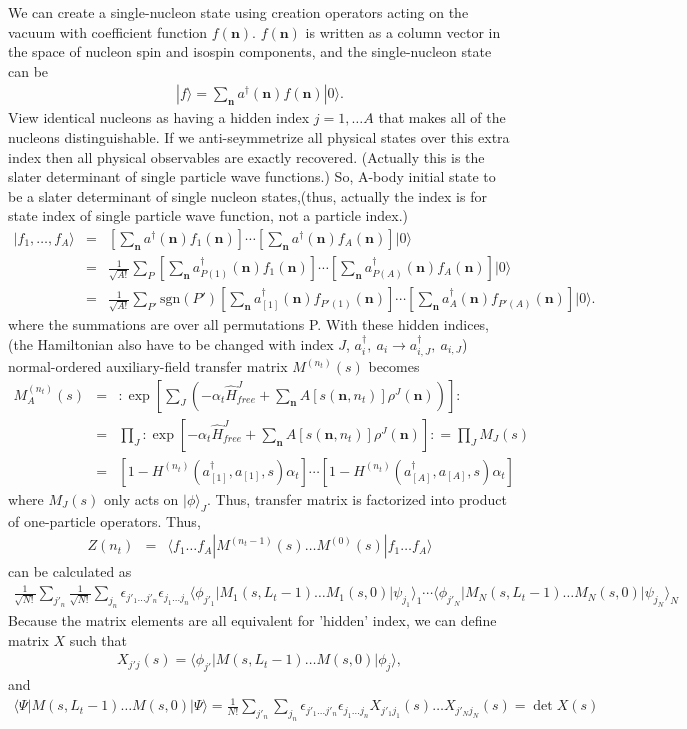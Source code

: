 \documentclass[10pt]{book}
\def\bm{\boldsymbol}
\newcommand{\bea}{\begin{eqnarray}}
\newcommand{\eea}{\end{eqnarray}}
\newcommand{\no}{\nonumber \\}
\def\vn{{\bm n}}
\def\la{\langle}
\def\ra{\rangle}
\begin{document}
We can create a single-nucleon state using creation operators acting on the vacuum with
coefficient function $f({\bm n})$. $f({\bm n})$ is written as a column vector 
in the space of nucleon spin and isospin components, and the single-nucleon state can be
\bea 
|f\ra =\sum_{\bm n} a^\dagger({\bm n})f({\bm n})|0\ra.
\eea 
View identical nucleons as having a hidden index $j=1,\dots A$
that makes all of the nucleons distinguishable. 
If we anti-seymmetrize all physical states over this extra index then all physical
observables are exactly recovered. (Actually this is the slater determinant of single particle wave functions.)
So, A-body initial state to be a slater determinant of single nucleon states,(thus,
actually the index is for state index of single particle wave function,
not a particle index.)
\bea 
|f_1,\dots ,f_A\ra &=&\left[\sum_{\bm n} a^\dagger({\bm n})f_1({\bm n})\right] \cdots 
                      \left[\sum_{\bm n} a^\dagger({\bm n})f_A({\bm n})\right]|0\ra       \no 
                   &=&\frac{1}{\sqrt{A!}}\sum_{P}
                     \left[\sum_{\bm n} a^\dagger_{P(1)}({\bm n})f_1({\bm n})\right]
                     \cdots \left[\sum_{\bm n} a^\dagger_{P(A)}({\bm n})f_A({\bm n})\right]|0\ra \no 
                   &=& \frac{1}{\sqrt{A!}}\sum_{P'} \mbox{sgn}(P')
                     \left[\sum_{\bm n} a^\dagger_{[1]}({\bm n})f_{P'(1)}({\bm n})\right]
                     \cdots \left[\sum_{\bm n} a^\dagger_{A}({\bm n})f_{P'(A)}({\bm n})\right]|0\ra.        
\eea 
where the summations are over all permutations P. With these hidden indices,
(the Hamiltonian also have to be
changed with index $J$,
$a^\dagger_i,\ a_i\to a^\dagger_{i,J} ,\ a_{i,J}$)
normal-ordered auxiliary-field transfer matrix $M^{(n_t)}(s)$ becomes
\bea 
M_A^{(n_t)}(s)&=&:\exp\left[\sum_J \left(-\alpha_t \hat{H}_{free}^J
           +\sum_{\vn} A[s(\vn,n_t)] \rho^J(\vn)\right) \right]:
          \no  
          &=&\prod_{J} :\exp\left[-\alpha_t \hat{H}^J_{free}
                     +\sum_{\vn} A[s(\vn,n_t)] \rho^J(\vn)\right]: =\prod_{J} M_J(s)\no 
          &=&\left[ 1- H^{(n_t)}(a^\dagger_{[1]},a_{[1]},s)\alpha_t\right]
            \cdots \left[ 1- H^{(n_t)}(a^\dagger_{[A]},a_{[A]},s)\alpha_t\right]           
\eea 
where $M_J(s)$ only acts on $|\phi\ra_J$. Thus, 
transfer matrix is factorized into product of one-particle operators. 
Thus,
\bea 
Z(n_t)&=&\la f_1\dots f_A| M^{(n_t-1)}(s)\dots M^{(0)}(s)|f_1\dots f_A\ra
\eea 
can be calculated as 
\bea 
\frac{1}{\sqrt{N!}}\sum_{j'_n}\frac{1}{\sqrt{N!}}\sum_{j_n}
 \epsilon_{j'_1 \dots j'_n}\epsilon_{j_1 \dots j_n}
 \la \phi_{j'_1} |M_{1}(s,L_t-1)\dots M_{1}(s,0)|\psi_{j_1}\ra_{1} \cdots 
 \la \phi_{j'_N} |M_{N}(s,L_t-1)\dots M_{N}(s,0)|\psi_{j_N}\ra_{N} 
\eea 
Because the matrix elements are all equivalent for 'hidden' index,
we can define matrix $X$ such that
\bea 
X_{j' j}(s)=\la \phi_{j'}|M(s,L_t-1)\dots M(s,0)|\phi_{j}\ra ,
\eea 
and
\bea 
\la \Psi| M(s,L_t-1)\dots M(s,0)|\Psi\ra
=
\frac{1}{N!}\sum_{j'_n}\sum_{j_n}
 \epsilon_{j'_1 \dots j'_n}\epsilon_{j_1 \dots j_n} X_{j'_1 j_1}(s)\dots X_{j'_N j_N}(s)
=\det X(s)  
\eea 
\end{document}
